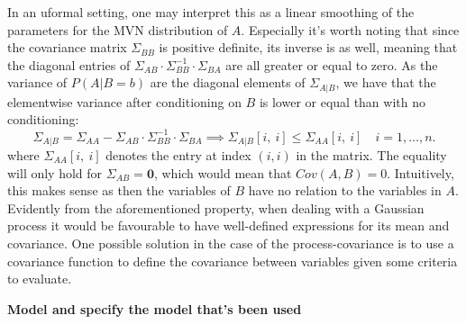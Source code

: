 In an uformal setting, one may interpret this as a linear smoothing of the parameters for the MVN distribution of $A$. Especially it's worth noting that since the covariance matrix $\Sigma_{BB}$ is positive definite, its inverse is as well, meaning that the diagonal entries of $\Sigma_{AB} \cdot \Sigma_{BB}^{-1} \cdot \Sigma_{BA}$ are all greater or equal to zero. As the variance of $P(A | B = b)$ are the diagonal elements of $\Sigma_{A|B}$, we have that the elementwise variance after conditioning on $B$ is lower or equal than with no conditioning: 
\begin{equation}
\Sigma_{A|B} = \Sigma_{AA} - \Sigma_{AB} \cdot \Sigma_{BB}^{-1} \cdot \Sigma_{BA}
\implies \Sigma_{A|B}[i, \ i]  \leq \Sigma_{AA}[i, \ i] \quad  i = 1, \dotsc, n.
\end{equation}
where $\Sigma_{AA}[i, \ i]$ denotes the entry at index $(i, i)$ in the matrix.
The equality will only hold for $\Sigma_{AB} = \mathbf{0}$, which would mean that $Cov(A, B) = 0$. Intuitively, this makes sense as then the variables of $B$ have no relation to the variables in $A$. \\

Evidently from the aforementioned property, when dealing with a Gaussian process it would be favourable to have well-defined expressions for its mean and covariance. One possible solution in the case of the process-covariance is to use a covariance function to define the covariance between variables given some criteria to evaluate.

\textbf{Model and specify the model that's been used}

